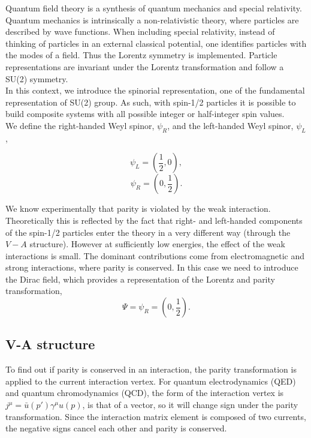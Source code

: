 \documentclass[10pt,swedish, openany]{book}
\begin{document}
Quantum field theory is a synthesis of quantum mechanics and special relativity. Quantum mechanics is intrinsically a non-relativistic theory, where particles are described by wave functions. When including special relativity, instead of thinking of particles in an external classical potential, one identifies particles with the modes of a field. Thus the Lorentz symmetry is implemented. Particle representations are invariant under the Lorentz transformation and follow a SU(2) symmetry.\\

In this context, we introduce the spinorial representation, one of the fundamental representation of SU(2) group. As such, with spin-1/2 particles it is possible to build composite systems with all possible integer or half-integer spin values.\\

We define the right-handed Weyl spinor, $\psi_R$, and the left-handed Weyl spinor, $\psi_L$, 

\begin{equation}
    \psi_L = (\frac{1}{2},0), 
\end{equation}
\begin{equation}
    \psi_R = (0,\frac{1}{2}).
\end{equation}

We know experimentally that parity is violated by the weak interaction. Theoretically this is reflected by the fact that right- and left-handed components of the spin-1/2 particles enter the theory in a very different way (through the $V-A$ structure). However at sufficiently low energies, the effect of the weak interactions is small. The dominant contributions come from electromagnetic and strong interactions, where parity is conserved. In this case we need to introduce the Dirac field, which provides a representation of the Lorentz and parity transformation,
\begin{equation}
    \Psi = \psi_R = (0,\frac{1}{2}).
\end{equation}

\subsection{V-A structure}

To find out if parity is conserved in an interaction, the parity transformation is applied to the current interaction vertex. For quantum electrodynamics (QED) and quantum chromodynamics (QCD), the form of the interaction vertex is $j^{\mu}=\bar{u}(p')\gamma^{\mu}u(p)$, is that of a vector, so it will change sign under the parity transformation. Since the interaction matrix element is composed of two currents, the negative signs cancel each other and parity is conserved.\\
\end{document}
